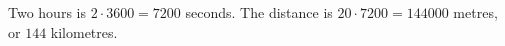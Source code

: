 Two hours is $2\cdot3600=7200$ seconds. The distance is $20\cdot7200=144000$ metres, or $\boxed{144}$ kilometres.
